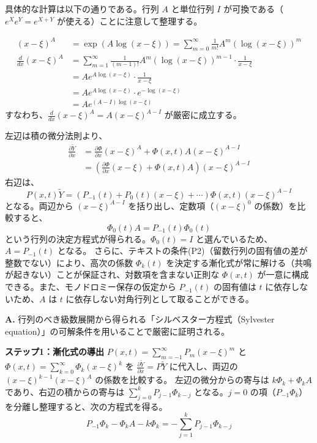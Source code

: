 \begin{Q}[係数行列 $P(x,t)$ が特異点 $x=\xi$ において高々1位の極（フックス型特異点）を持つと仮定したとき、基本解行列が局所表示 $Y(x,t) = \Phi(x,t)(x-\xi)^A G(t)$ を持つことは、具体的にどのように証明（構成）されるか？]
\begin{Q}
具体的な計算は以下の通りである。行列 $A$ と単位行列 $I$ が可換である（$e^X e^Y = e^{X+Y}$ が使える）ことに注意して整理する。

\begin{align*}
  (x-\xi)^A &= \exp(A \log(x-\xi)) = \sum_{m=0}^{\infty} \frac{1}{m!} A^m (\log(x-\xi))^m \\[3mm]
  \frac{d}{dx} (x-\xi)^A &= \sum_{m=1}^{\infty} \frac{1}{(m-1)!} A^m (\log(x-\xi))^{m-1} \cdot \frac{1}{x-\xi} \\[2mm]
  &= A e^{A \log(x-\xi)} \cdot \frac{1}{x-\xi} \\[2mm]
  &= A e^{A \log(x-\xi)} \cdot e^{-\log(x-\xi)} \\[2mm]
  &= A e^{(A-I) \log(x-\xi)}
\end{align*}
すなわち、$\frac{d}{dx}(x-\xi)^A = A(x-\xi)^{A-I}$ が厳密に成立する。
\end{Q}

左辺は積の微分法則より、
\begin{align*}
  \frac{\partial \tilde{Y}}{\partial x} &= \frac{\partial \Phi}{\partial x}(x-\xi)^A + \Phi(x,t) A (x-\xi)^{A-I} \\
  &= \left( \frac{\partial \Phi}{\partial x}(x-\xi) + \Phi(x,t)A \right) (x-\xi)^{A-I}
\end{align*}
右辺は、
\[
  P(x,t)\tilde{Y} = \left( P_{-1}(t) + P_0(t)(x-\xi) + \cdots \right) \Phi(x,t) (x-\xi)^{A-I}
\]
となる。両辺から $(x-\xi)^{A-I}$ を括り出し、定数項（$(x-\xi)^0$ の係数）を比較すると、
\[
  \Phi_0(t) A = P_{-1}(t) \Phi_0(t)
\]
という行列の決定方程式が得られる。$\Phi_0(t) = I$ と選んでいるため、$A = P_{-1}(t)$ となる。
さらに、テキストの条件(P2)（留数行列の固有値の差が整数でない）により、高次の係数 $\Phi_k(t)$ を決定する漸化式が常に解ける（共鳴が起きない）ことが保証され、対数項を含まない正則な $\Phi(x,t)$ が一意に構成できる。また、モノドロミー保存の仮定から $P_{-1}(t)$ の固有値は $t$ に依存しないため、$A$ は $t$ に依存しない対角行列として取ることができる。

\begin{Q}%
\textbf{A.} 行列のべき級数展開から得られる「シルベスター方程式（Sylvester equation）」の可解条件を用いることで厳密に証明される。

\textbf{ステップ1：漸化式の導出}
$P(x,t) = \sum_{m=-1}^\infty P_m (x-\xi)^m$ と $\Phi(x,t) = \sum_{k=0}^\infty \Phi_k (x-\xi)^k$ を $\frac{\partial \tilde{Y}}{\partial x} = P\tilde{Y}$ に代入し、両辺の $(x-\xi)^{k-1} (x-\xi)^A$ の係数を比較する。
左辺の微分からの寄与は $k\Phi_k + \Phi_k A$ であり、右辺の積からの寄与は $\sum_{j=0}^k P_{j-1}\Phi_{k-j}$ となる。$j=0$ の項（$P_{-1}\Phi_k$）を分離し整理すると、次の方程式を得る。
\[
  P_{-1}\Phi_k - \Phi_k A - k\Phi_k = -\sum_{j=1}^k P_{j-1}\Phi_{k-j}
\]


\end{Q}
\end{Q}
